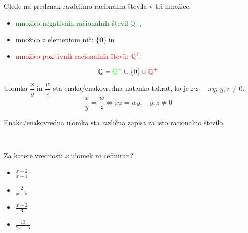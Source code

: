                     
            

            
                Glede na predznak razdelimo racionalna števila v tri množice:
                \begin{itemize}
                    \item \textcolor{green}{množico negativnih racionalnih števil $\mathbf{\mathbb{Q}^-}$},
                    \item množico z elementom nič: $\mathbf{\{0\}}$ in
                    \item \textcolor{red}{množico pozitivnih racionalnih števil: $\mathbf{\mathbb{Q}^+}$}.
                \end{itemize}
                $$ \mathbb{Q}=\textcolor{green}{\mathbb{Q}^-}\cup\{0\}\cup\textcolor{red}{\mathbb{Q}^+} $$
            
            


        

        
            
                Ulomka $\dfrac{x}{y}$ in $\dfrac{w}{z}$ sta enaka/enakovredna natanko takrat, ko je $xz=wy$; $y,z\neq 0$.
                $$\dfrac{x}{y}=\dfrac{w}{z}\Leftrightarrow xz=wy; \quad y,z\neq 0$$
            

            
                Enaka/enakovredna ulomka sta različna zapisa za isto racionalno število.
            
        ~\\




        
            \begin{naloga}
                Za katere vrednosti $x$ ulomek ni definiran?
                \begin{itemize}
                    \item $\frac{x-2}{x+1}$ 
                    \item $\frac{2}{x-5}$ 
                    \item $\frac{x+2}{3}$ 
                    \item $\frac{13}{2x-5}$ 
                \end{itemize}
            \end{naloga}
        

